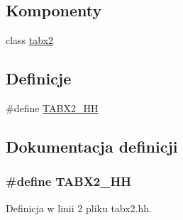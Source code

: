 \subsection*{Komponenty}
\begin{DoxyCompactItemize}
\item 
class \hyperlink{classtabx2}{tabx2}
\end{DoxyCompactItemize}
\subsection*{Definicje}
\begin{DoxyCompactItemize}
\item 
\#define \hyperlink{tabx2_8hh_ab76bf9329c796034d3ea1300008f135e}{T\-A\-B\-X2\-\_\-\-H\-H}
\end{DoxyCompactItemize}


\subsection{Dokumentacja definicji}
\hypertarget{tabx2_8hh_ab76bf9329c796034d3ea1300008f135e}{
\subsubsection[{T\-A\-B\-X2\-\_\-\-H\-H}]{\setlength{\rightskip}{0pt plus 5cm}\#define T\-A\-B\-X2\-\_\-\-H\-H}}\label{tabx2_8hh_ab76bf9329c796034d3ea1300008f135e}


Definicja w linii 2 pliku tabx2.\-hh.

